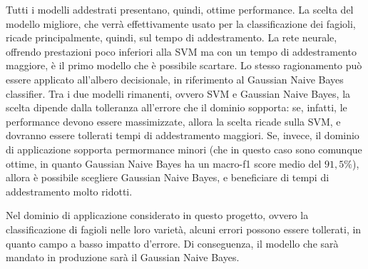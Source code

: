Tutti i modelli addestrati presentano, quindi, ottime performance.
La scelta del modello migliore, che verrà effettivamente usato 
per la classificazione dei fagioli, ricade principalmente, quindi,
sul tempo di addestramento.
La rete neurale, offrendo prestazioni poco inferiori alla SVM ma con un tempo 
di addestramento maggiore, è il primo modello che è possibile scartare.
Lo stesso ragionamento può essere applicato all'albero decisionale,
in riferimento al Gaussian Naive Bayes classifier.
Tra i due modelli rimanenti, ovvero SVM e Gaussian Naive Bayes, la scelta dipende
dalla tolleranza all'errore che il dominio sopporta: se, infatti,
le performance devono essere massimizzate, allora la scelta ricade sulla SVM, 
e dovranno essere tollerati tempi di addestramento maggiori.
Se, invece, il dominio di applicazione sopporta permormance minori (che in questo
caso sono comunque ottime, in quanto Gaussian Naive Bayes ha un
macro-f1 score medio del $91,5\%$), allora è possibile scegliere Gaussian Naive Bayes,
e beneficiare di tempi di addestramento molto ridotti.

Nel dominio di applicazione considerato in questo progetto, ovvero la classificazione
di fagioli nelle loro varietà, alcuni errori possono essere tollerati, 
in quanto campo a basso impatto d'errore. Di conseguenza, il modello che
sarà mandato in produzione sarà il Gaussian Naive Bayes.